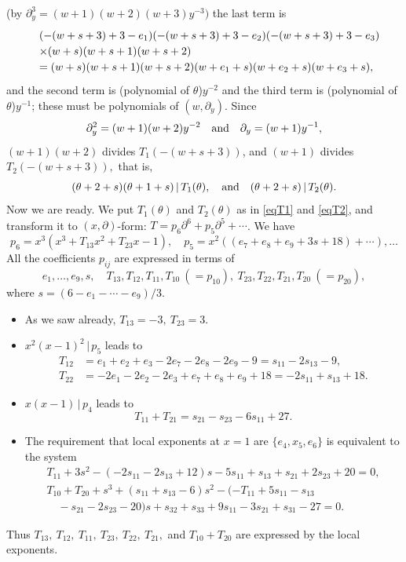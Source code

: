 \documentclass[a4paper,12pt]{article}
\theoremstyle{definition}
\theoremstyle{remark}
\numberwithin{equation}{section} %
\begin{document}
(by $\partial_y^3=(w+1)(w+2)(w+3)y^{-3})$ the last term is 
\[ \def\arraystretch{1.2} \begin{array}{ll}
  &(-(w+s+3)+3-e_1)(-(w+s+3)+3-e_2)(-(w+s+3)+3-e_3)\\
  &\times(w+s)(w+s+1)(w+s+2)\\
  &=(w+s)(w+s+1)(w+s+2)(w+e_1+s)(w+e_2+s)(w+e_3+s),
\end{array}\]
and the second term is (polynomial of $\theta$)$y^{-2}$
and the third term is (polynomial of $\theta$)$y^{-1}$;
these must be polynomials of $(w,\partial_y)$.
Since
$$\partial_y^2=(w+1)(w+2)y^{-2}\quad {\rm and}\quad \partial_y=(w+1)y^{-1},
$$
$(w+1)(w+2)$ divides $T_1(-(w+s+3))$, and $(w+1)$ divides $T_2(-(w+s+3)),$
that is,
  $$(\theta+2+s)(\theta+1+s)\,|\,T_1(\theta),\quad {\rm and}\quad (\theta+2+s)\,|\,T_2(\theta).$$
Now we are ready.
We put $T_1(\theta)$ and $T_2(\theta)$ as in \eqref{eqT1} and \eqref{eqT2},
and transform it to $(x,\partial)$-form: $T=p_6\partial^6+p_5\partial^5+\cdots$.
We have
$$p_6=x^3(x^3+T_{13}x^2+T_{23}x-1),
  \quad p_5=x^2((e_7+e_8+e_9+3s+18)+\cdots),\dots$$
  All the coefficients $p_{ij}$ are expressed in terms of
  $$e_1,\dots, e_9,s,\quad T_{13},T_{12},T_{11},T_{10}\ (=p_{10}),
  \  T_{23},T_{22},T_{21},T_{20}\ (=p_{20}),$$
where $s=(6-e_1-\cdots-e_9)/3$. 

\begin{itemize}[leftmargin=30pt]%
\item As we saw already, $T_{13}=-3,\ T_{23}=3$.
\item $x^2(x-1)^2\,|\,p_5$ leads to
  $$\begin{array}{ll}T_{12} &=e_1+e_2 +e_3 -2e_7 -2e_8 -2e_9 -9=s_{11}-2s_{13}-9,\\
  T_{22} &= -2e_1 -2e_2 -2e_3 +e_7 +e_8 +e_9 +18=-2s_{11}+s_{13}+18.\end{array}$$

\item $x(x-1)\,|\,p_4$ leads to
  $$T_{11}+  T_{21}=s_{21}-s_{23}-6s_{11}+27.$$%

\item The requirement that local exponents at $x=1$ are $\{e_4,x_5,e_6\}$ is equivalent to the system 
  $$\begin{array}{l}T_{11}+3s^2 - (-2s_{11} - 2s_{13} + 12)s
      - 5s_{11} + s_{13} + s_{21} + 2s_{23} + 20=0,\\
  T_{10} + T_{20}+s^3 + (s_{11} + s_{13} - 6)s^2 - (-T_{11} + 5s_{11} - s_{13} \\
  \quad  - s_{21} - 2s_{23} - 20)s + s_{32} + s_{33} + 9s_{11} - 3s_{21}
  + s_{31} - 27=0.\end{array}$$
\end{itemize}
Thus $T_{13},\ T_{12},\ T_{11},\ T_{23},\ T_{22},\ T_{21},$
and $T_{10}+T_{20}$ are expressed by the local exponents.\par
\end{document}
